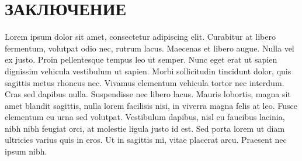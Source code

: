 \chapter*{ЗАКЛЮЧЕНИЕ}

Lorem ipsum dolor sit amet, consectetur adipiscing elit. Curabitur at libero fermentum, volutpat odio nec, rutrum lacus. Maecenas et libero augue. Nulla vel ex justo. Proin pellentesque tempus leo ut semper. Nunc eget erat ut sapien dignissim vehicula vestibulum ut sapien. Morbi sollicitudin tincidunt dolor, quis sagittis metus rhoncus nec. Vivamus elementum vehicula tortor nec interdum. Cras sed dapibus nulla. Suspendisse nec libero lacus. Mauris lobortis, magna sit amet blandit sagittis, nulla lorem facilisis nisi, in viverra magna felis at leo. Fusce elementum eu urna sed volutpat. Vestibulum dapibus, nisl eu faucibus lacinia, nibh nibh feugiat orci, at molestie ligula justo id est. Sed porta lorem ut diam ultricies varius quis in eros. Ut in sagittis mi, vitae placerat arcu. Praesent nec ipsum nibh.
